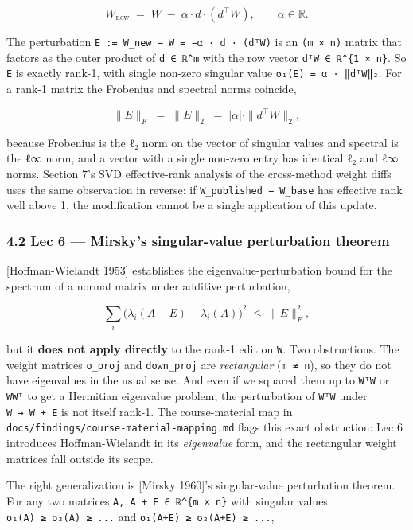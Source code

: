 \documentclass[
  11pt,
]{article}
\begin{document}
\[ W_{\text{new}} \;=\; W \;-\; \alpha \cdot d \cdot (d^{\top} W), \qquad \alpha \in \mathbb{R}. \]

The perturbation \texttt{E\ :=\ W\_new\ −\ W\ =\ −α\ ·\ d\ ·\ (dᵀW)} is
an \texttt{(m\ ×\ n)} matrix that factors as the outer product of
\texttt{d\ ∈\ ℝ\^{}m} with the row vector
\texttt{dᵀW\ ∈\ ℝ\^{}\{1\ ×\ n\}}. So \texttt{E} is exactly rank-1, with
single non-zero singular value
\texttt{σ₁(E)\ =\ \textbar{}α\textbar{}\ ·\ ‖dᵀW‖₂}. For a rank-1 matrix
the Frobenius and spectral norms coincide,

\[ \|E\|_{F} \;=\; \|E\|_{2} \;=\; |\alpha| \cdot \|d^{\top} W\|_{2}, \]

because Frobenius is the ℓ₂ norm on the vector of singular values and
spectral is the ℓ∞ norm, and a vector with a single non-zero entry has
identical ℓ₂ and ℓ∞ norms. Section 7's SVD effective-rank analysis of
the cross-method weight diffs uses the same observation in reverse: if
\texttt{W\_published\ −\ W\_base} has effective rank well above 1, the
modification cannot be a single application of this update.

\subsubsection{4.2 Lec 6 --- Mirsky's singular-value perturbation
theorem}\label{lec-6-mirskys-singular-value-perturbation-theorem}

{[}Hoffman-Wielandt 1953{]} establishes the eigenvalue-perturbation
bound for the spectrum of a normal matrix under additive perturbation,

\[ \sum_{i} \big(\lambda_{i}(A + E) - \lambda_{i}(A)\big)^{2} \;\le\; \|E\|_{F}^{2}, \]

but it \textbf{does not apply directly} to the rank-1 edit on
\texttt{W}. Two obstructions. The weight matrices \texttt{o\_proj} and
\texttt{down\_proj} are \emph{rectangular} (\texttt{m\ ≠\ n}), so they
do not have eigenvalues in the usual sense. And even if we squared them
up to \texttt{WᵀW} or \texttt{WWᵀ} to get a Hermitian eigenvalue
problem, the perturbation of \texttt{WᵀW} under \texttt{W\ →\ W\ +\ E}
is not itself rank-1. The course-material map in
\texttt{docs/findings/course-material-mapping.md} flags this exact
obstruction: Lec 6 introduces Hoffman-Wielandt in its \emph{eigenvalue}
form, and the rectangular weight matrices fall outside its scope.

The right generalization is {[}Mirsky 1960{]}'s singular-value
perturbation theorem. For any two matrices
\texttt{A,\ A\ +\ E\ ∈\ ℝ\^{}\{m\ ×\ n\}} with singular values
\texttt{σ₁(A)\ ≥\ σ₂(A)\ ≥\ ...} and
\texttt{σ₁(A+E)\ ≥\ σ₂(A+E)\ ≥\ ...},
\end{document}
